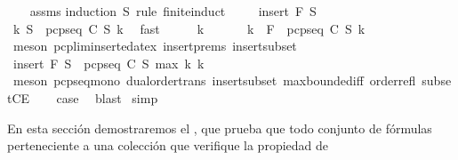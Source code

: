 \begin{isabellebody}
%
\isadelimproof
\ \ %
\endisadelimproof
%
\isatagproof
{}\isamarkupfalse%
\ assms\isanewline
{}\isamarkupfalse%
{\isacharparenleft}induction\ S{\isacharprime}\ rule{\isacharcolon}\ finite{\isacharunderscore}induct{\isacharparenright}\ \isanewline
\ \ \isamarkupfalse%
\ {\isacharparenleft}insert\ F\ S{\isacharprime}{\isacharparenright}\isanewline
\ \ \isamarkupfalse%
\ {\isachardoublequoteopen}{\isasymexists}k{\isachardot}\ S{\isacharprime}\ {\isasymsubseteq}\ pcp{\isacharunderscore}seq\ C\ S\ k{\isachardoublequoteclose}\ \isamarkupfalse%
\ fast\isanewline
\ \ \isamarkupfalse%
\ \isamarkupfalse%
\ k{}\ \isacommand{{\isachardot}{\isachardot}}\isamarkupfalse%
\isanewline
\ \ \isamarkupfalse%
\ \isamarkupfalse%
\ k{}\ \ {\isachardoublequoteopen}F\ {\isasymin}\ pcp{\isacharunderscore}seq\ C\ S\ k{}{\isachardoublequoteclose}\isanewline
\ \ \ \ \isamarkupfalse%
\ {\isacharparenleft}meson\ pcp{\isacharunderscore}lim{\isacharunderscore}inserted{\isacharunderscore}at{\isacharunderscore}ex\ insert{\isachardot}prems\ insert{\isacharunderscore}subset{\isacharparenright}\isanewline
\ \ \isamarkupfalse%
\ \isamarkupfalse%
\ {\isachardoublequoteopen}insert\ F\ S{\isacharprime}\ {\isasymsubseteq}\ pcp{\isacharunderscore}seq\ C\ S\ {\isacharparenleft}max\ k{}\ k{}{\isacharparenright}{\isachardoublequoteclose}\isanewline
\ \ \ \ \isamarkupfalse%
\ {\isacharparenleft}meson\ pcp{\isacharunderscore}seq{\isacharunderscore}mono\ dual{\isacharunderscore}order{\isachardot}trans\ insert{\isacharunderscore}subset\ max{\isachardot}bounded{\isacharunderscore}iff\ order{\isacharunderscore}refl\ subsetCE{\isacharparenright}\isanewline
\ \ \isamarkupfalse%
\ {\isacharquery}case\ \isamarkupfalse%
\ blast\isanewline
{}\isamarkupfalse%
\ simp%
\endisatagproof
{\isafoldproof}%
%
\isadelimproof
%
\endisadelimproof
%
\isadelimdocument
%
\endisadelimdocument
%
\isatagdocument
%
\isamarkuptrue%
%
\endisatagdocument
{\isafolddocument}%
%
\isadelimdocument
%
\endisadelimdocument
%
\begin{isamarkuptext}%
En esta sección demostraremos el , que prueba 
  que todo conjunto de fórmulas  perteneciente a una colección  que verifique la propiedad de 

\end{isamarkuptext}
\end{isabellebody}
